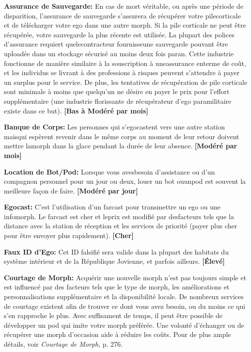 \textbf{Assurance de Sauvegarde:} En cas de mort véritable, ou après une période de disparition, l'assurance de sauvegarde s'assurera de récupérer votre pilecorticale et de télécharger votre ego dans une autre morph. Si la pile corticale ne peut être récupérée, votre sauvegarde la plus récente est utilisée. La plupart des polices d'assurance requiert quelecontracteur fournisseune sauvegarde pouvant être uploadée dans un stockage sécurisé au moins deux fois paran. Cette industrie fonctionne de manière similaire à la  souscription à uneassurance enterme de coût, et les individus se livrant à des professions à risques peuvent s'attendre à payer un surplus pour le service. De plus, les tentatives de récupération de pile corticale sont minimale à moins que quelqu'un ne désire en payer le prix pour l'effort supplémentaire (une industrie florissante de récupérateur d'ego paramilitaire existe dans ce but). \textbf{[Bas à Modéré par mois]} 

\textbf{Banque de Corps:} Les personnes qui s'egocastent vers une autre station maisqui espèrent revenir dans le même corps au moment de leur retour doivent mettre lamorph dans la glace pendant la durée de leur absence. \textbf{[Modéré par mois]} 

\textbf{Location de Bot/Pod:} Lorsque vous avesbesoin d'assistance ou d'un compagnon personnel pour un jour ou deux, louer un bot ouunpod est souvent la meilleure façon de faire. \textbf{[Modéré par jour]} 

\textbf{Egocast:} C'est l'utilisation d'un farcast pour transmettre un ego ou une infomorph. Le farcast est cher et leprix est modifié par desfacteurs tels que la distance avec la station de réception et les services de priorité (payer plus cher pour être envoyer plus rapidement). \textbf{[Cher]} 

\textbf{Faux ID d'Ego:} Cet ID falsifié sera valide dans la plupart des habitats du système intérieur et de la République Jovienne, et parfois ailleurs. \textbf{[Élevé]} 

\textbf{Courtage de Morph:} Acquérir une nouvelle morph n'est pas toujours simple et est influencé par des facteurs tels que le type de morph, les améliorations et personnalisations supplémentaire et la disponibilité locale. De nombreux services de courtage existent afin de trouver ce dont vous avez besoin, ou du moins ce qui s'en rapproche le plus. Avec suffisament de temps, il peut être possible de développer un pod qui imite votre morph préférée. Une volonté d'échanger ou de récupérer une morph d'occasion aide à réduire les coûts. Pour de plus ample détails, voir \emph{Courtage de Morph}, p. 276. 

